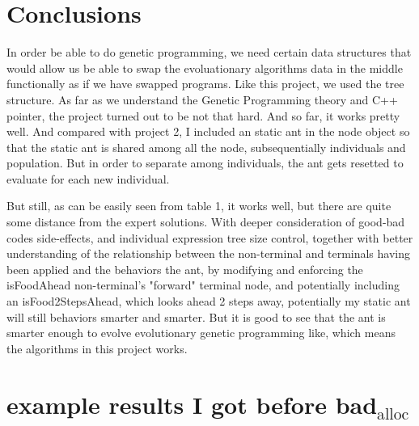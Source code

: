 \documentclass[10pt,b5paper]{article}
\begin{document}
\section{Conclusions}
\label{sec-3}

In order be able to do genetic programming, we need certain data structures that would allow us be able to swap the evoluationary algorithms data in the middle functionally as if we have swapped programs. Like this project, we used the tree structure. As far as we understand the Genetic Programming theory and C++ pointer, the project turned out to be not that hard. And so far, it works pretty well. 
And compared with project 2, I included an static ant in the node object so that the static ant is shared among all the node, subsequentially individuals and population. But in order to separate among individuals, the ant gets resetted to evaluate for each new individual.

But still, as can be easily seen from table 1, it works well, but there are quite some distance from the expert solutions. With deeper consideration of good-bad codes side-effects, and individual expression tree size control, together with better understanding of the relationship between the non-terminal and terminals having been applied and the behaviors the ant, by modifying and enforcing the isFoodAhead non-terminal's "forward" terminal node, and potentially including an isFood2StepsAhead, which looks ahead 2 steps away, potentially my static ant will still behaviors smarter and smarter. But it is good to see that the ant is smarter enough to evolve evolutionary genetic programming like, which means the algorithms in this project works.
\section{example results I got before bad$_{\text{alloc}}$}
\label{sec-4}
\end{document}
